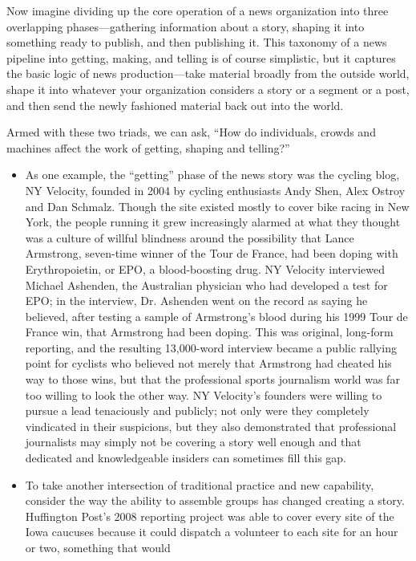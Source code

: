 Now imagine dividing up the core operation of a news organization into three
overlapping phases—gathering information about a story, shaping it into something
ready to publish, and then publishing it. This taxonomy of a news pipeline
into getting, making, and telling is of course simplistic, but it captures the basic
logic of news production—take material broadly from the outside world, shape
it into whatever your organization considers a story or a segment or a post, and
then send the newly fashioned material back out into the world.

Armed with these two triads, we can ask, ``How do individuals, crowds and
machines affect the work of getting, shaping and telling?''

\begin{itemize}
\item As one example, the ``getting'' phase of the news story was the
cycling blog, NY Velocity, founded in 2004 by cycling enthusiasts
Andy Shen, Alex Ostroy and Dan Schmalz. Though the site existed
mostly to cover bike racing in New York, the people running it grew increasingly alarmed at what they thought was a culture of willful
blindness around the possibility that Lance Armstrong, seven-time
winner of the Tour de France, had been doping with Erythropoietin,
or EPO, a blood-boosting drug. NY Velocity interviewed Michael
Ashenden, the Australian physician who had developed a test for
EPO; in the interview, Dr. Ashenden went on the record as saying
he believed, after testing a sample of Armstrong’s blood during his
1999 Tour de France win, that Armstrong had been doping. This
was original, long-form reporting, and the resulting 13,000-word
interview became a public rallying point for cyclists who believed
not merely that Armstrong had cheated his way to those wins, but
that the professional sports journalism world was far too willing to
look the other way. NY Velocity’s founders were willing to pursue a
lead tenaciously and publicly; not only were they completely vindicated
in their suspicions, but they also demonstrated that professional
journalists may simply not be covering a story well enough and that
dedicated and knowledgeable insiders can sometimes fill this gap.
\item To take another intersection of traditional practice and new capability,
consider the way the ability to assemble groups has changed
creating a story. Huffington Post’s 2008 reporting project was able
to cover every site of the Iowa caucuses because it could dispatch
a volunteer to each site for an hour or two, something that would

\end{itemize}
